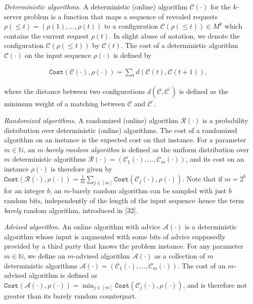 \documentclass[10pt,a4paper]{article}
\begin{document}
\emph{Deterministic algorithms.} A deterministic (online) algorithm $\mathcal{C}(\cdot)$ for the $k$-server problem is a function that maps a sequence of revealed requests $\rho(\leq t)=(\rho(1),\dots,\rho(t))$ to a configuration $\mathcal{C}(\rho(\leq t))\in M^{k}$ which contains the current request $\rho(t)$. In slight abuse of notation, we denote the configuration $\mathcal{C}(\rho(\leq t))$ by $\mathcal{C}(t)$. The cost of a deterministic algorithm $\mathcal{C}(\cdot)$ on the input sequence $\rho(\cdot)$ is defined by\par


\[\begin{gathered}
{\texttt{Cost}}(\mathcal{C}(\cdot),\rho(\cdot))=\sum_{t}d(\mathcal{C}(t),\mathcal{C}(t+1)),
\end{gathered}\]


where the distance between two configurations $d(\mathcal{C},\mathcal{C}^{\prime})$ is defined as the minimum weight of a matching between $\mathcal{C}$ and $\mathcal{C}^{\prime}$.\par




\emph{Randomized algorithms.} A randomized (online) algorithm $\mathcal{R}(\cdot)$ is a probability distribution over deterministic (online) algorithms. The cost of a randomized algorithm on an instance is the expected cost on that instance. For a parameter $m\in\mathbb{N}$, an \emph{$m$-barely random algorithm} is defined as the uniform distribution over $m$ deterministic algorithms $\mathcal{R}(\cdot)=(\mathcal{C}_{1}(\cdot),\dots,\mathcal{C}_{m}(\cdot))$, and its cost on an instance $\rho(\cdot)$ is therefore given by ${\texttt{Cost}}(\mathcal{R}(\cdot),\rho(\cdot))=\frac{1}{m}\sum_{j\in[m]}{\texttt{Cost}}(\mathcal{C}_{j}(\cdot),\rho(\cdot))$. Note that if $m=2^{b}$ for an integer $b$, an $m$-barely random algorithm can be sampled with just $b$ random bits, independently of the length of the input sequence–hence the term \emph{barely} random algorithm, introduced in [32].\par




\emph{Advised algorithm.} An online algorithm with advice $\mathcal{A}(\cdot)$ is a deterministic algorithm whose input is augmented with some bits of advice supposedly provided by a third party that knows the problem instance.
For any parameter $m\in\mathbb{N}$, we define an $m$-advised algorithm $\mathcal{A}(\cdot)$ as a collection of $m$ deterministic algorithms $\mathcal{A}(\cdot)=(\mathcal{C}_{1}(\cdot),\dots,\mathcal{C}_{m}(\cdot))$. The cost of an $m$-advised algorithm is defined as
${\texttt{Cost}}(\mathcal{A}(\cdot),\rho(\cdot))=\min_{j\in[m]}{\texttt{Cost}}(\mathcal{C}_{j}(\cdot),\rho(\cdot))$, and is therefore not greater than its barely random counterpart.\par
\end{document}
